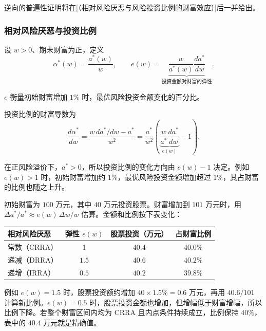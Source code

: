 逆向的普遍性证明将在[（相对风险厌恶与风险投资比例的财富效应）]后一并给出。

\subsubsection{相对风险厌恶与投资比例}
\begin{tcolorbox}[knowledge,title=投资比例与财富弹性]
设 $w>0$、期末财富为正，定义
\[
 \alpha^*(w)=\frac{a^*(w)}{w},\qquad
 e(w)=\underbrace{\frac{w}{a^*(w)}\frac{da^*}{dw}}_{\text{投资金额对财富的弹性}}.
\]

$e$ 衡量初始财富增加 $1\%$ 时，最优风险投资金额变化的百分比。
\end{tcolorbox}

投资比例的财富导数为
\[
 \frac{d\alpha^*}{dw}
 =\frac{w\,da^*/dw-a^*}{w^2}
 =\frac{a^*}{w^2}\left(
 \underbrace{\frac{w}{a^*}\frac{da^*}{dw}}_{e(w)}-1\right).
\]

在正风险溢价下，$a^*>0$，所以投资比例的变化方向由 $e(w)-1$ 决定。例如 $e(w)>1$ 时，初始财富增加约 $1\%$，最优风险投资金额增加超过 $1\%$，其占财富的比例也随之上升。

\begin{tcolorbox}[example,title=课堂算例：财富增加一万元后的股票配置]
初始财富为 $100$ 万元，其中 $40$ 万元投资股票。财富增加到 $101$ 万元时，用
$\Delta a^*/a^*\approx e(w)\,\Delta w/w$ 估算。金额和比例按下表变化：
\begin{center}
\begin{tabular}{lccc}
相对风险厌恶 & 弹性 $e(w)$ & 股票投资（万元） & 占财富比例\\\hline
常数（CRRA） & $1$   & $40.4$ & $40.0\%$\\
递减（DRRA） & $1.5$ & $40.6$ & $40.2\%$\\
递增（IRRA） & $0.5$ & $40.2$ & $39.8\%$
\end{tabular}
\end{center}
例如 $e(w)=1.5$ 时，股票投资额约增加 $40\times1.5\%=0.6$ 万元，再用 $40.6/101$ 计算新比例。$e(w)=0.5$ 时，股票投资金额也增加，但增幅低于财富增幅，所以比例下降。若整个财富区间内均为 CRRA 且内点条件持续成立，比例保持 $40\%$，表中的 $40.4$ 万元就是精确值。
\end{tcolorbox}

